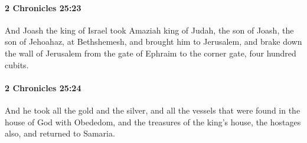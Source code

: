 		\paragraph{2 Chronicles 25:23} %
			\label{2CHRONICLES-25-23}

			And Joash the king of Israel took Amaziah king of Judah, the son of Joash, the son of Jehoahaz, at Bethshemesh, and brought him to Jerusalem, and brake down the wall of Jerusalem from the gate of Ephraim to the corner gate, four hundred cubits.


		\paragraph{2 Chronicles 25:24} %
			\label{2CHRONICLES-25-24}

			And he took all the gold and the silver, and all the vessels that were found in the house of God with Obededom, and the treasures of the king's house, the hostages also, and returned to Samaria.

